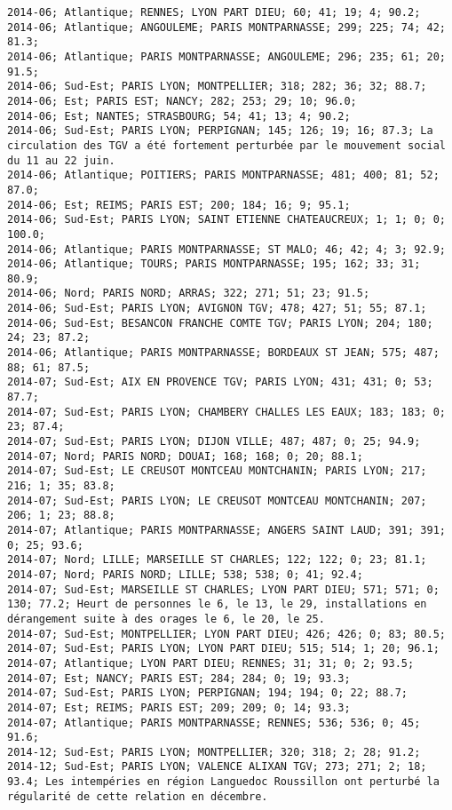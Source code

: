 \documentclass{article}
\begin{document}
\begin{Verbatim}[commandchars=\\\{\}]
2014-06; Atlantique; RENNES; LYON PART DIEU; 60; 41; 19; 4; 90.2; 
2014-06; Atlantique; ANGOULEME; PARIS MONTPARNASSE; 299; 225; 74; 42; 81.3; 
2014-06; Atlantique; PARIS MONTPARNASSE; ANGOULEME; 296; 235; 61; 20; 91.5; 
2014-06; Sud-Est; PARIS LYON; MONTPELLIER; 318; 282; 36; 32; 88.7; 
2014-06; Est; PARIS EST; NANCY; 282; 253; 29; 10; 96.0; 
2014-06; Est; NANTES; STRASBOURG; 54; 41; 13; 4; 90.2; 
2014-06; Sud-Est; PARIS LYON; PERPIGNAN; 145; 126; 19; 16; 87.3; La circulation des TGV a été fortement perturbée par le mouvement social du 11 au 22 juin.
2014-06; Atlantique; POITIERS; PARIS MONTPARNASSE; 481; 400; 81; 52; 87.0; 
2014-06; Est; REIMS; PARIS EST; 200; 184; 16; 9; 95.1; 
2014-06; Sud-Est; PARIS LYON; SAINT ETIENNE CHATEAUCREUX; 1; 1; 0; 0; 100.0; 
2014-06; Atlantique; PARIS MONTPARNASSE; ST MALO; 46; 42; 4; 3; 92.9; 
2014-06; Atlantique; TOURS; PARIS MONTPARNASSE; 195; 162; 33; 31; 80.9; 
2014-06; Nord; PARIS NORD; ARRAS; 322; 271; 51; 23; 91.5; 
2014-06; Sud-Est; PARIS LYON; AVIGNON TGV; 478; 427; 51; 55; 87.1; 
2014-06; Sud-Est; BESANCON FRANCHE COMTE TGV; PARIS LYON; 204; 180; 24; 23; 87.2; 
2014-06; Atlantique; PARIS MONTPARNASSE; BORDEAUX ST JEAN; 575; 487; 88; 61; 87.5; 
2014-07; Sud-Est; AIX EN PROVENCE TGV; PARIS LYON; 431; 431; 0; 53; 87.7; 
2014-07; Sud-Est; PARIS LYON; CHAMBERY CHALLES LES EAUX; 183; 183; 0; 23; 87.4; 
2014-07; Sud-Est; PARIS LYON; DIJON VILLE; 487; 487; 0; 25; 94.9; 
2014-07; Nord; PARIS NORD; DOUAI; 168; 168; 0; 20; 88.1; 
2014-07; Sud-Est; LE CREUSOT MONTCEAU MONTCHANIN; PARIS LYON; 217; 216; 1; 35; 83.8; 
2014-07; Sud-Est; PARIS LYON; LE CREUSOT MONTCEAU MONTCHANIN; 207; 206; 1; 23; 88.8; 
2014-07; Atlantique; PARIS MONTPARNASSE; ANGERS SAINT LAUD; 391; 391; 0; 25; 93.6; 
2014-07; Nord; LILLE; MARSEILLE ST CHARLES; 122; 122; 0; 23; 81.1; 
2014-07; Nord; PARIS NORD; LILLE; 538; 538; 0; 41; 92.4; 
2014-07; Sud-Est; MARSEILLE ST CHARLES; LYON PART DIEU; 571; 571; 0; 130; 77.2; Heurt de personnes le 6, le 13, le 29, installations en dérangement suite à des orages le 6, le 20, le 25.
2014-07; Sud-Est; MONTPELLIER; LYON PART DIEU; 426; 426; 0; 83; 80.5; 
2014-07; Sud-Est; PARIS LYON; LYON PART DIEU; 515; 514; 1; 20; 96.1; 
2014-07; Atlantique; LYON PART DIEU; RENNES; 31; 31; 0; 2; 93.5; 
2014-07; Est; NANCY; PARIS EST; 284; 284; 0; 19; 93.3; 
2014-07; Sud-Est; PARIS LYON; PERPIGNAN; 194; 194; 0; 22; 88.7; 
2014-07; Est; REIMS; PARIS EST; 209; 209; 0; 14; 93.3; 
2014-07; Atlantique; PARIS MONTPARNASSE; RENNES; 536; 536; 0; 45; 91.6; 
2014-12; Sud-Est; PARIS LYON; MONTPELLIER; 320; 318; 2; 28; 91.2; 
2014-12; Sud-Est; PARIS LYON; VALENCE ALIXAN TGV; 273; 271; 2; 18; 93.4; Les intempéries en région Languedoc Roussillon ont perturbé la régularité de cette relation en décembre.

\end{Verbatim}
\end{document}
